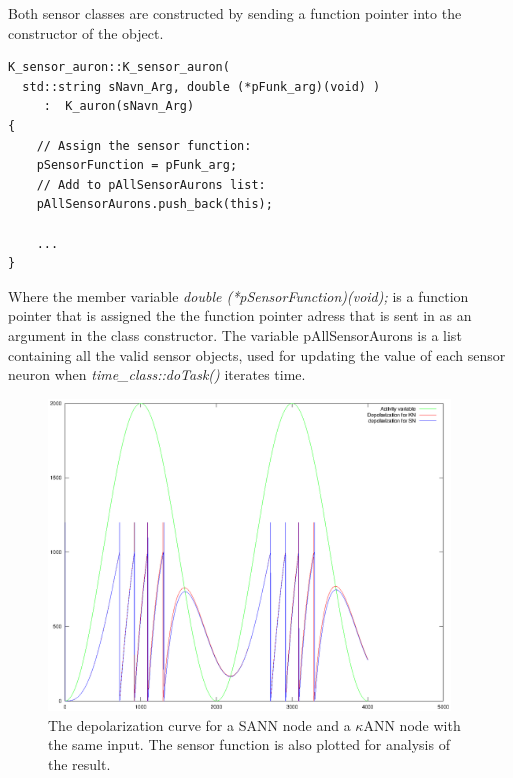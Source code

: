Both sensor classes are constructed by sending a function pointer into the constructor of the object. 

\begin{lstlisting}
K_sensor_auron::K_sensor_auron(
  std::string sNavn_Arg, double (*pFunk_arg)(void) ) 
     :  K_auron(sNavn_Arg)
{
	// Assign the sensor function:
	pSensorFunction = pFunk_arg;
	// Add to pAllSensorAurons list:
	pAllSensorAurons.push_back(this);

	...
}
\end{lstlisting}

Where the member variable \emph{double \mbox{(*pSensorFunction)(void);}} is a function pointer that is assigned the the function pointer adress that is sent in as an argument in the class constructor.
The variable pAllSensorAurons is a list containing all the valid sensor objects, used for updating the value of each sensor neuron when \emph{time\_class::doTask()} iterates time. %

\begin{figure}[hbtp!]
	\label{figComparisonBetweenSsensorAndKsensorDepolCurve}
	\centering
		\includegraphics[width=0.95\textwidth]{eps_Comparison_between_the_two_sensors__depol.eps}
	\caption{The depolarization curve for a SANN node and a $\kappa$ANN node with the same input. The sensor function is also plotted for analysis of the result.}
\end{figure}

